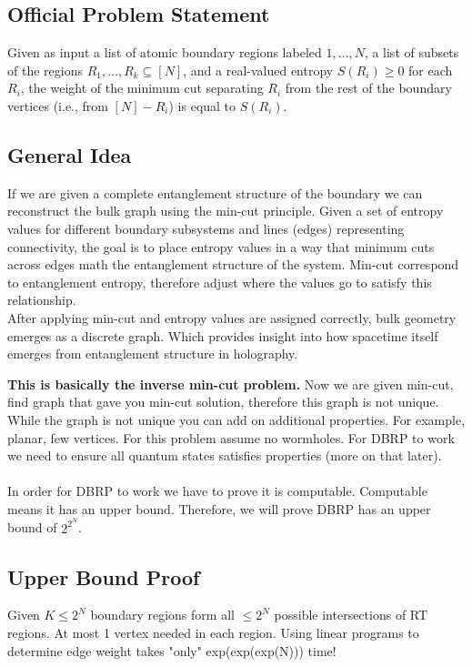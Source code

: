 \documentclass[12pt]{article}
\begin{document}
\subsection{Official Problem Statement}
\hspace{0.5cm} Given as input a list of atomic boundary regions labeled \( 1, \dots, N \), a list of subsets of the regions \( R_1, \dots, R_k \subseteq [N] \), and a real-valued entropy \( S(R_i) \geq 0 \) for each \( R_i \), the weight of the minimum cut separating \( R_i \) from the rest of the boundary vertices (i.e., from \( [N] - R_i \)) is equal to \( S(R_i) \).


\subsection{General Idea}
\hspace{0.5cm} If we are given a complete entanglement structure of the boundary we can reconstruct the bulk graph using the min-cut principle. Given a set of entropy values for different boundary subsystems and lines (edges) representing connectivity, the goal is to place entropy values in a way that minimum cuts across edges math the entanglement structure of the system. Min-cut correspond to entanglement entropy, therefore adjust where the values go to satisfy this relationship.
\\
\indent After applying min-cut and entropy values are assigned correctly, bulk geometry emerges as a discrete graph. Which provides insight into how spacetime itself emerges from entanglement structure in holography. 

\textbf{This is basically the inverse min-cut problem.} Now we are given min-cut, find graph that gave you min-cut solution, therefore this graph is not unique. While the graph is not unique you can add on additional properties. For example, planar, few vertices. For this problem assume no wormholes. For DBRP to work we need to ensure all quantum states satisfies properties (more on that later). \\
\\
\indent In order for DBRP to work we have to prove it is computable. Computable means it has an upper bound.
Therefore, we will prove DBRP has an upper bound of $2^{2^N}$.

\subsection{Upper Bound Proof}
Given $K\leq2^N$ boundary regions form all $\leq2^N$ possible intersections of RT regions. At most 1 vertex needed in each region. Using linear programs to determine edge weight takes "only" exp(exp(exp(N))) time!
\end{document}
